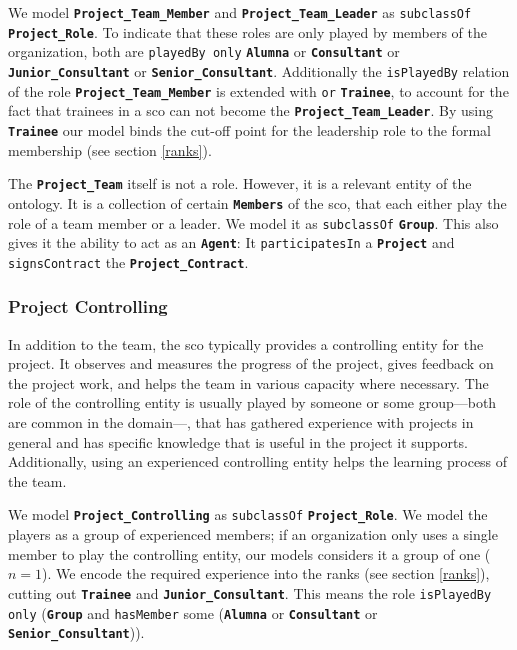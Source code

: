 \documentclass[a4paper, DIV=13, BCOR=0cm]{scrbook}
\newcommand{\class}[1]{\texttt{\textbf{#1}}}
\newcommand{\relation}[1]{\texttt{#1}}
\begin{document}
We model \class{Project\_Team\_Member} and \class{Project\_Team\_Leader} as \relation{subclassOf} \class{Project\_Role}. To indicate that these roles are only played by members of the organization, both are \relation{playedBy only}
\class{Alumna} or \class{Consultant} or \class{Junior\_Consultant} or \class{Senior\_Consultant}. Additionally the \relation{isPlayedBy} relation of the role \class{Project\_Team\_Member} is extended with \relation{or} \class{Trainee}, to account for the fact that trainees in a \gls{sco} can not become the \class{Project\_Team\_Leader}. By using \class{Trainee} our model binds the cut-off point for the leadership role to the formal membership (see section \ref{ranks}).

The \class{Project\_Team} itself is not a role. However, it is a relevant entity of the ontology. It is a collection of certain \class{Members} of the \gls{sco}, that each either play the role of a team member or a leader. We model it as \relation{subclassOf} \class{Group}. This also gives it the ability to act as an \class{Agent}: It \relation{participatesIn} a \class{Project} and \relation{signsContract} the \class{Project\_Contract}.

\subsubsection{Project Controlling}
In addition to the team, the \gls{sco} typically provides a controlling entity for the project. It observes and measures the progress of the project, gives feedback on the project work, and helps the team in various capacity where necessary. The role of the controlling entity is usually played by someone or some group---both are common in the domain---, that has gathered experience with projects in general and has specific knowledge that is useful in the project it supports. Additionally, using an experienced controlling entity helps the learning process of the team.

We model \class{Project\_Controlling} as \relation{subclassOf} \class{Project\_Role}. We model the players as a group of experienced members; if an organization only uses a single member to play the controlling entity, our models considers it a group of one ($n = 1$). We encode the required experience into the ranks (see section \ref{ranks}), cutting out \class{Trainee} and \class{Junior\_Consultant}. This means the role \relation{isPlayedBy only} (\class{Group} and \relation{hasMember} some (\class{Alumna} or \class{Consultant} or \class{Senior\_Consultant})).
\end{document}

